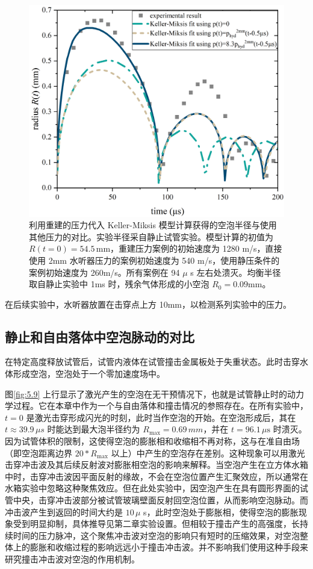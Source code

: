 \begin{figure}[H]
  \centering
  \includegraphics[width=0.7\linewidth]{img/fig5.8.png}
  \caption[利用重建的压力代入
Keller-Miksis
模型计算获得的空泡半径与使用其他压力的对比]{利用重建的压力代入
Keller-Miksis
模型计算获得的空泡半径与使用其他压力的对比。实验半径采自静止试管实验。模型计算的初值为
$R (t = 0) = 54.5\,\mathrm{mm}$，重建压力案例的初始速度为 1280
m/s，直接使用 2mm 水听器压力的案例初始速度为 540
m/s，使用静压条件的案例初始速度为 260m/s。所有案例在 94 $\mu$ s
左右处溃灭。均衡半径取自静止实验中 1ms 时，残余气体形成的小空泡
$R_0=0.09$mm。}
  \label{fig:5.8}
\end{figure}
在后续实验中，水听器放置在击穿点上方 10mm，以检测系列实验中的压力。


\subsection{静止和自由落体中空泡脉动的对比}

在特定高度释放试管后，试管内液体在试管撞击金属板处于失重状态。此时击穿水体形成空泡，空泡处于一个零加速度场中。

图\ref{fig:5.9}
上行显示了激光产生的空泡在无干预情况下，也就是试管静止时的动力学过程。它在本章中作为一个与自由落体和撞击情况的参照存在。在所有实验中，
$t=0$ 是激光击穿形成闪光的时刻，此时当作空泡的开始。在空泡形成后，其在
$t \approx 39.9\,\mu s$ 时能达到最大泡半径约为
$R_\textrm{max}=0.69\,mm$，并在 $t=96.1\,\mu \mathrm{s}$
时溃灭。因为试管体积的限制，这使得空泡的膨胀相和收缩相不再对称，这与在准自由场（即空泡距离边界
$20*R_{\text{max}}$
以上）中产生的空泡存在差别。这种现象可以用激光击穿冲击波及其后续反射波对膨胀相空泡的影响来解释。当空泡产生在立方体水箱中时，击穿冲击波因平面反射的缘故，不会在空泡位置产生汇聚效应，所以通常在水箱实验中忽略这种聚焦效应。但在此处实验中，因空泡产生在具有圆形界面的试管中央，击穿冲击波部分被试管玻璃壁面反射回空泡位置，从而影响空泡脉动。而冲击波产生到返回的时间大约是
$10\,\mu$
s，此时空泡处于膨胀相，使得空泡的膨胀现象受到明显抑制，具体推导见第二章实验设置。但相较于撞击产生的高强度，长持续时间的压力脉冲，这个聚焦冲击波对空泡的影响只有短时的压缩效果，对空泡整体上的膨胀和收缩过程的影响远远小于撞击冲击波。并不影响我们使用这种手段来研究撞击冲击波对空泡的作用机制。


